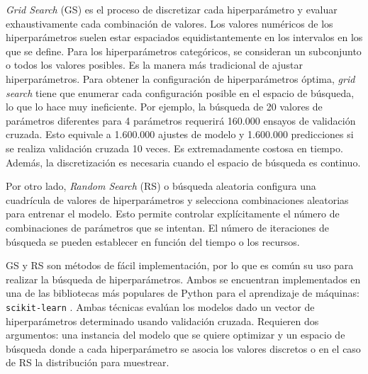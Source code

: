 \textit{Grid Search} (GS) es el proceso de discretizar cada hiperparámetro y evaluar exhaustivamente cada combinación de valores. Los valores numéricos de los hiperparámetros suelen estar espaciados equidistantemente en los intervalos en los que se define. Para los hiperparámetros categóricos, se consideran un subconjunto o todos los valores posibles. Es la manera más tradicional de ajustar hiperparámetros. Para obtener la configuración de hiperparámetros óptima, \textit{grid search} tiene que enumerar cada configuración posible en el espacio de búsqueda, lo que lo hace muy ineficiente. Por ejemplo, la búsqueda de 20 valores de parámetros diferentes para 4 parámetros requerirá 160.000 ensayos de validación cruzada. Esto equivale a 1.600.000 ajustes de modelo y 1.600.000 predicciones si se realiza validación cruzada 10 veces. Es extremadamente costosa en tiempo. Además, la discretización es necesaria cuando el espacio de búsqueda es continuo.

Por otro lado, \textit{Random Search} (RS) o búsqueda aleatoria configura una cuadrícula de valores de hiperparámetros y selecciona combinaciones aleatorias para entrenar el modelo. Esto permite controlar explícitamente el número de combinaciones de parámetros que se intentan. El número de iteraciones de búsqueda se pueden establecer en función del tiempo o los recursos.


GS y RS son métodos de fácil implementación, por lo que es común su uso para realizar la búsqueda de hiperparámetros. Ambos se encuentran implementados en una de las bibliotecas más populares de Python para el aprendizaje de máquinas: \texttt{scikit-learn} \cite{scikit-learn}. Ambas técnicas evalúan los modelos dado un vector de hiperparámetros determinado usando validación cruzada. Requieren dos argumentos: una instancia del modelo que se quiere optimizar y un espacio de búsqueda donde a cada hiperparámetro se asocia los valores discretos o en el caso de RS la distribución para muestrear.

